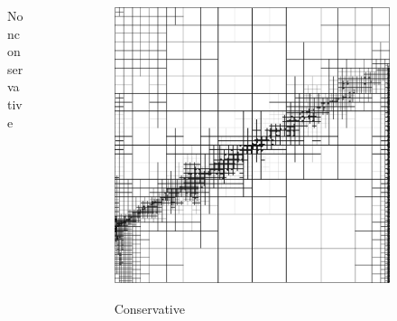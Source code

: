 \documentclass{beamer}
\begin{document}
\begin{frame}
{\begin{columns}
\begin{column}{0.49\textwidth}
\begin{figure}
Nonconservative
\end{figure}
\end{column}
\begin{column}{0.49\textwidth}
\begin{figure}
\centering
\includegraphics[width=1.0\textwidth]{InnerLayer/modified8c_mesh.png}

Conservative
\end{figure}
\end{column}
\end{columns}
}
\end{frame}

\end{document}

